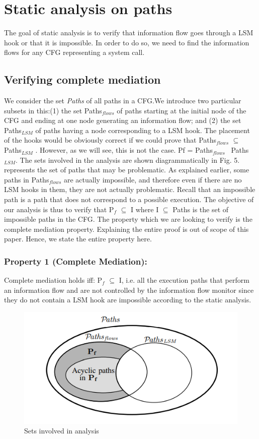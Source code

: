 \section{Static analysis on paths}
The goal of static analysis is to verify that information flow goes through a LSM hook or that it is impossible. In order to do so, we need to find the information flows for any CFG representing a system call.

\subsection{Verifying complete mediation}
We consider the set \textit{Paths} of all paths in a CFG.We introduce two particular subsets in this:(1) the set
Paths$_{flows}$  of paths starting at the initial node of the CFG and
ending at one node generating an information flow; and (2) the
set Paths$_{LSM}$  of paths having a node corresponding to a LSM
hook. The placement of the hooks would be obviously correct
if we could prove that Paths$_{flows}$ $\subseteq$ Paths$_{LSM}$ . However, as
we will see, this is not the case. Pf =  Paths$_{flows}$ \ Paths$_{LSM}$. The sets involved in the analysis are shown diagrammatically in Fig. 5.
represents the set of paths that may be problematic.
\vskip 0.1in
As explained earlier, some paths in Paths$_{flows}$  are actually
impossible, and therefore even if there are no LSM hooks
in them, they are not actually problematic. Recall that an
impossible path is a path that does not correspond to a possible
execution. The objective of our analysis is thus to verify that
P$_f$ $\subseteq$ I where I $\subseteq$ Paths is the set of impossible paths in
the CFG.
\vskip 0.1in
The property which we are looking to verify is the complete mediation property. Explaining the entire proof is out of scope of this paper. Hence, we state the entire property here.
\vskip 0.1in
\subsubsection[Property 1 (Complete Mediation)]{Property 1 (Complete Mediation):}
Complete mediation holds iff: P$_f$ $\subseteq$ I, i.e. all the execution
paths that perform an information flow and are not controlled
by the information flow monitor since they do not contain a
LSM hook are impossible according to the static analysis.
\begin{figure}
	\centering
	\includegraphics[width=0.7\linewidth]{Sets-involved}
	\caption[Sets involved in analysis]{Sets involved in analysis}
	\label{fig:sets-involved}
\end{figure}

